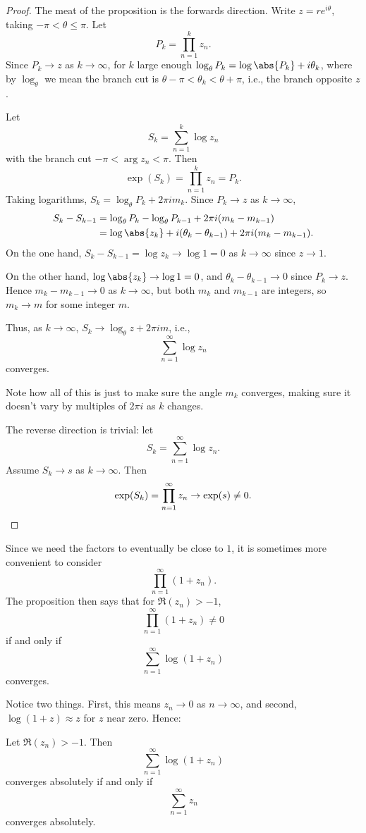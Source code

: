 \begin{proof}
	The meat of the proposition is the forwards direction.
	Write $z = r e^{i \theta}$, taking $-\pi < \theta \leq \pi$.
	Let
	\[
		P_k = \prod_{n = 1}^k z_n.
	\]
	Since $P_k \to z$ as $k \to \infty$, for $k$ large enough $\log_\theta P_k = \log\abs{P_k} + i \theta_k$, where by $\log_\theta$ we mean the branch cut is $\theta - \pi < \theta_k < \theta + \pi$, i.e., the branch opposite $z$.

	Let
	\[
		S_k = \sum_{n = 1}^k \log z_n
	\]
	with the branch cut $-\pi < \arg z_n < \pi$.
	Then
	\[
		\exp(S_k) = \prod_{n = 1}^k z_n = P_k.
	\]
	Taking logarithms, $S_k = \log_\theta P_k + 2 \pi i m_k$.
	Since $P_k \to z$ as $k \to \infty$,
	\begin{align*}
		S_k - S_{k - 1} &= \log_\theta P_k - \log_\theta P_{k - 1} + 2 \pi i (m_k - m_{k - 1}) \\
		&= \log \abs{z_k} + i (\theta_k - \theta_{k - 1}) + 2\pi i (m_k - m_{k - 1}).
	\end{align*}
	On the one hand, $S_k - S_{k - 1} = \log z_k \to \log 1 = 0$ as $k \to \infty$ since $z \to 1$.

	On the other hand, $\log \abs{z_k} \to \log 1 = 0$, and $\theta_k - \theta_{k - 1} \to 0$ since $P_k \to z$.
	Hence $m_k - m_{k - 1} \to 0$ as $k \to \infty$, but both $m_k$ and $m_{k - 1}$ are integers, so $m_k \to m$ for some integer $m$.

	Thus, as $k \to \infty$, $S_k \to \log_\theta z + 2 \pi i m$, i.e.,
	\[
		\sum_{n = 1}^\infty \log z_n
	\]
	converges.

	Note how all of this is just to make sure the angle $m_k$ converges, making sure it doesn't vary by multiples of $2 \pi i$ as $k$ changes.

	The reverse direction is trivial: let
	\[
		S_k = \sum_{n = 1}^\infty \log z_n.
	\]
	Assume $S_k \to s$ as $k \to \infty$.
	Then
	\[
		\exp(S_k) = \prod_{n = 1}^\infty z_n \to \exp(s) \neq 0. \qedhere
	\]
\end{proof}

\begin{remark}
	Since we need the factors to eventually be close to $1$, it is sometimes more convenient to consider
	\[
		\prod_{n = 1}^\infty (1 + z_n).
	\]
	The proposition then says that for $\Re(z_n) > -1$,
	\[
		\prod_{n = 1}^\infty (1 + z_n) \neq 0
	\]
	if and only if
	\[
		\sum_{n = 1}^\infty \log(1 + z_n)
	\]
	converges.
\end{remark}

Notice two things.
First, this means $z_n \to 0$ as $n \to \infty$, and second, $\log(1 + z) \approx z$ for $z$ near zero.
Hence:
\begin{exercise}\label{ex:lec19a}
	Let $\Re(z_n) > -1$.
	Then
	\[
		\sum_{n = 1}^\infty \log(1 + z_n)
	\]
	converges absolutely if and only if
	\[
		\sum_{n = 1}^\infty z_n
	\]
	converges absolutely.
\end{exercise}


